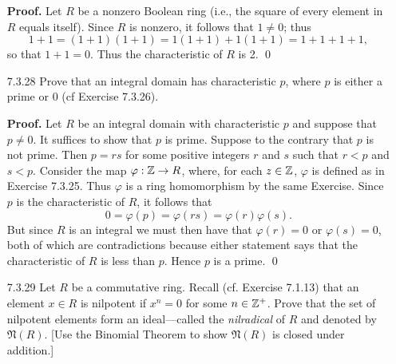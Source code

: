 \begin{enumerate}
      \textbf{Proof.} Let $R$ be a nonzero Boolean ring (i.e., the square of 
      every element in $R$ equals itself). Since $R$ is nonzero,
      it follows that $1 \neq 0$; thus
      $$1 + 1 = (1 + 1)(1 + 1) = 1(1 + 1) + 1(1 + 1) = 1 + 1 + 1 + 1,$$
      so that $1 + 1 = 0$. Thus the characteristic of $R$ is 2. \qed
   \item[7.3.28]  Prove that an integral domain has characteristic $p$, where
                  $p$ is either a prime or 0 (cf Exercise 7.3.26).

      \textbf{Proof.} Let $R$ be an integral domain with characteristic $p$ and
      suppose that $p \neq 0$. It suffices to show that $p$ is prime. Suppose to
      the contrary that $p$ is not prime. Then $p = rs$ for some positive 
      integers $r$ and $s$ such that $r < p$ and $s < p$. Consider the map
      $\varphi : \mathbb{Z} \rightarrow R$, where, for each $z \in \mathbb{Z}$, $\varphi$ is 
      defined as in Exercise 7.3.25. Thus $\varphi$ is a ring homomorphism by
      the same Exercise. Since $p$ is the characteristic of $R$, it 
      follows that
      $$0 = \varphi(p) = \varphi(rs) = \varphi(r)\varphi(s).$$
      But since $R$ is an integral we must then have that $\varphi(r) = 0$ or
      $\varphi(s) = 0$, both of which are contradictions because either
      statement says that the characteristic of $R$ is less than $p$. Hence $p$
      is a prime. \qed      
   \item[7.3.29]  Let $R$ be a commutative ring. Recall (cf. Exercise 7.1.13)
                  that an element $x \in R$ is nilpotent if $x^n = 0$ for some
                  $n \in \mathbb{Z}^+$. Prove that the set of nilpotent elements form an 
                  ideal---called the \textit{nilradical} of $R$ and denoted by
                  $\mathfrak{N}(R)$. [Use the Binomial Theorem to show
                  $\mathfrak{N}(R)$ is closed under addition.]


\end{enumerate}
